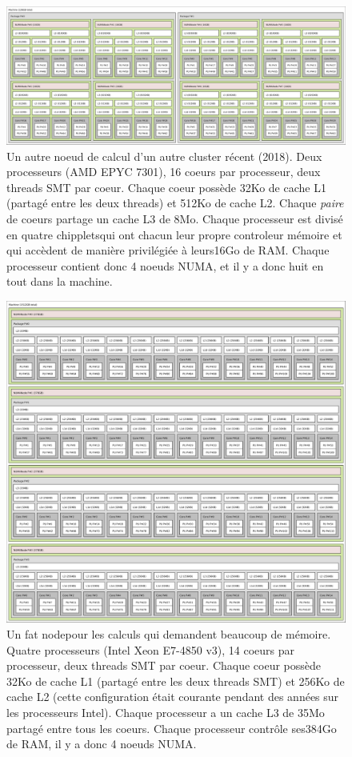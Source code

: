 \begin{figure}
  \centering
  \includegraphics[width=\textwidth]{lstopo_chiclet.pdf}
  \caption{Un autre noeud de calcul d'un autre cluster récent (2018). Deux
    processeurs (AMD EPYC 7301), 16 coeurs par processeur, deux threads SMT par
    coeur. Chaque coeur possède 32Ko de cache L1 (partagé entre les deux
    threads) et 512Ko de cache L2. Chaque \emph{paire} de coeurs partage un
    cache L3 de 8Mo. Chaque processeur est divisé en quatre \og chipplets\fg qui
    ont chacun leur propre controleur mémoire et qui accèdent de manière
    privilégiée à \og leurs\fg 16Go de RAM. Chaque processeur contient donc 4
    noeuds NUMA, et il y a donc huit en tout dans la machine.\label{fig:arch2}}
\end{figure}


\begin{figure}
    \centering
  \includegraphics[height=0.5\textheight]{lstopo_wurst.pdf}
  \caption{Un \og fat node\fg pour les calculs qui demandent beaucoup de
    mémoire. Quatre processeurs (Intel Xeon E7-4850 v3), 14 coeurs par
    processeur, deux threads SMT par coeur. Chaque coeur possède 32Ko de cache
    L1 (partagé entre les deux threads SMT) et 256Ko de cache L2 (cette
    configuration était courante pendant des années sur les processeurs
    Intel). Chaque processeur a un cache L3 de 35Mo partagé entre tous les
    coeurs. Chaque processeur contrôle \og ses\fg 384Go de RAM, il y a donc 4
    noeuds NUMA.\label{fig:arch3}}
\end{figure}

